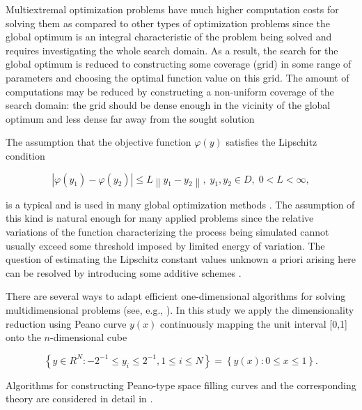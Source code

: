 \documentclass[mathematics,article,submit,pdftex,moreauthors]{Definitions/mdpi}
\begin{document}
Multiextremal optimization problems have much higher computation costs for solving them as compared to other types of optimization problems since the global optimum is an integral characteristic of the problem being solved and requires investigating the whole search domain. As a result, the search for the global optimum is reduced to constructing some coverage (grid) in some range of parameters and choosing the optimal function value on this grid. The amount of computations may be reduced by constructing a non-uniform coverage of the search domain: the grid should be dense enough in the vicinity of the global optimum and less dense far away from the sought solution

The assumption that the objective function $\varphi(y)$ satisfies the Lipschitz condition

\begin{linenomath}
\begin{equation}
\left|\varphi(y_1)-\varphi(y_2)\right|\leq L\left\|y_1-y_2\right\|,\; y_1,y_2 \in D, \; 0<L<\infty,
\end{equation}
\end{linenomath}
is a typical and is used in many global optimization methods \cite{Sergeyev2013,Evtushenko2013,Jones2009,Zilinskas2010}.
The assumption of this kind is natural enough for many applied problems since the relative variations of the function characterizing the process being simulated cannot usually exceed some threshold imposed by limited energy of variation. The question of estimating the Lipschitz constant values unknown {\textit a priori} arising here can be resolved by introducing some additive schemes \cite{Strongin2020,Strongin2020_1}.

There are several ways to adapt efficient one-dimensional algorithms for solving multidimensional problems (see, e.g., \cite{Sergeyev2017,Zilinskas2014}). In this study we apply the dimensionality reduction using Peano curve $y(x)$ continuously mapping the unit interval [0,1] onto the $n$-dimensional cube
\begin{linenomath}
\begin{equation}
\left\{y\in R^N: -2^{-1}\leq y_i \leq 2^{-1}, 1 \leq i \leq N\right\}=\left\{y(x):0\leq x \leq 1 \right\}.
\end{equation}
\end{linenomath}

Algorithms for constructing Peano-type space filling curves and the corresponding theory are considered in detail in \cite{Strongin2000,Sergeyev2013}.
\end{document}
